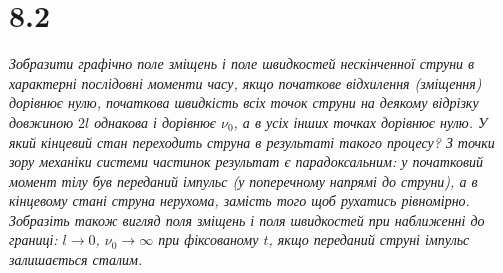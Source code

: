 


%


\section[Задача №8.2]{8.2}

\textit{Зобразити графічно поле зміщень і поле швидкостей нескінченної струни в характерні послідовні моменти часу, якщо початкове відхилення (зміщення) дорівнює нулю, початкова швидкість всіх точок струни на деякому відрізку довжиною $2l$ однакова і дорівнює $\nu_0$, а в усіх інших точках дорівнює нулю. У який кінцевий стан переходить струна в результаті такого процесу? З точки зору механіки системи частинок результат є парадоксальним: у початковий момент тілу був переданий імпульс (у поперечному напрямі до струни), а в кінцевому стані струна нерухома, замість того щоб рухатись рівномірно. Зобразіть також вигляд поля зміщень і поля швидкостей при наближенні до границі: $l \to 0$, $\nu_0 \to \infty$ при фіксованому $t$, якщо переданий струні імпульс залишається сталим.}


%
